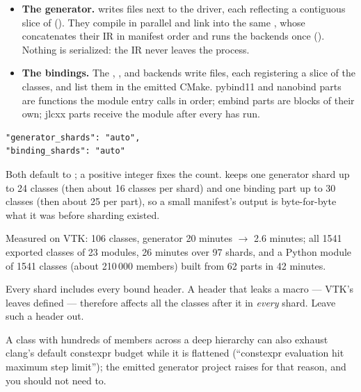 \begin{itemize}
  \item \textbf{The generator.}  writes 
    files next to the driver, each reflecting a contiguous slice of
     (). They compile in
    parallel and link into the same , whose 
    concatenates their IR in manifest order and runs the backends once
    (). Nothing is serialized: the IR never
    leaves the process.
  \item \textbf{The bindings.} The , ,
     and  backends write
     files, each registering a slice of the
    classes, and list them in the emitted CMake. pybind11 and nanobind parts
    are functions the module entry calls in order; embind parts are
     blocks of their own; jlcxx parts receive the
    module after every  has run.
\end{itemize}

\begin{lstlisting}[style=json]
"generator_shards": "auto",
"binding_shards": "auto"
\end{lstlisting}

Both default to ; a positive integer fixes the count.
 keeps one generator shard up to 24 classes (then about 16 classes
per shard) and one binding part up to 30 classes (then about 25 per part), so a
small manifest's output is byte-for-byte what it was before sharding existed.

Measured on VTK: 106 classes, generator 20 minutes $\to$
2.6 minutes; all 1541 exported classes of 23 modules, 26 minutes over 97
shards, and a Python module of 1541 classes (about 210\,000 members) built from
62 parts in 42 minutes.

\begin{warn}
Every shard includes every bound header. A header that leaks a macro --- VTK's
 leaves  defined
--- therefore affects all the classes after it in \emph{every} shard. Leave such
a header out.
\end{warn}

A class with hundreds of members across a deep hierarchy can also exhaust
clang's default constexpr budget while it is flattened (``constexpr evaluation
hit maximum step limit''); the emitted generator project raises
 for that reason, and you should not need to.

